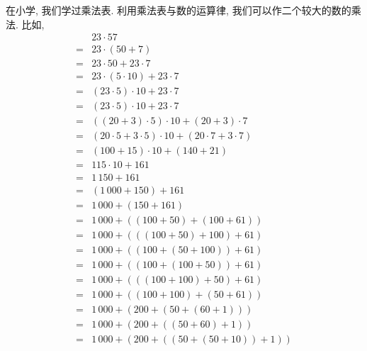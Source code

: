 \begin{example}
    在小学, 我们学过乘法表.
    利用乘法表与数的运算律,
    我们可以作二个较大的数的乘法.
    比如,
    \begin{align*}
             & 23 \cdot 57                                    \\
        = {} & 23 \cdot (50 + 7)                              \\
        = {} & 23 \cdot 50 + 23 \cdot 7                       \\
        = {} & 23 \cdot (5 \cdot 10) + 23 \cdot 7             \\
        = {} & (23 \cdot 5) \cdot 10 + 23 \cdot 7             \\
        = {} & (23 \cdot 5) \cdot 10 + 23 \cdot 7             \\
        = {} & ((20 + 3) \cdot 5) \cdot 10 + (20 + 3) \cdot 7 \\
        = {} & (20 \cdot 5 + 3 \cdot 5) \cdot 10
        + (20 \cdot 7 + 3 \cdot 7 )                           \\
        = {} & (100 + 15) \cdot 10
        + (140 + 21)                                          \\
        = {} & 115 \cdot 10 + 161                             \\
        = {} & 1\,150 + 161                                   \\
        = {} & (1\,000 + 150) + 161                           \\
        = {} & 1\,000 + (150 + 161)                           \\
        = {} & 1\,000 + ((100 + 50) + (100 + 61))             \\
        = {} & 1\,000 + (((100 + 50) + 100) + 61)             \\
        = {} & 1\,000 + ((100 + (50 + 100)) + 61)             \\
        = {} & 1\,000 + ((100 + (100 + 50)) + 61)             \\
        = {} & 1\,000 + (((100 + 100) + 50) + 61)             \\
        = {} & 1\,000 + ((100 + 100) + (50 + 61))             \\
        = {} & 1\,000 + (200 + (50 + (60 + 1)))               \\
        = {} & 1\,000 + (200 + ((50 + 60) + 1))               \\
        = {} & 1\,000 + (200 + ((50 + (50 + 10)) + 1))        \\

\end{align*}
\end{example}
